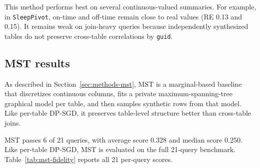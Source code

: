 \documentclass[12pt,letterpaper]{article}
\renewcommand{\_}{\textunderscore\allowbreak}
\begin{document}
This method performs best on several continuous-valued summaries. For example, in \texttt{SleepPivot}, on-time and off-time remain close to real values (RE 0.13 and 0.15). It remains weak on join-heavy queries because independently synthesized tables do not preserve cross-table correlations by \texttt{guid}.

\subsection{MST results}

As described in Section~\ref{sec:methods-mst}, MST is a marginal-based baseline that discretizes continuous columns, fits a private maximum-spanning-tree graphical model per table, and then samples synthetic rows from that model. Like per-table DP-SGD, it preserves table-level structure better than cross-table joins.

MST passes 6 of 21 queries, with average score 0.328 and median score 0.250. Like per-table DP-SGD, MST is evaluated on the full 21-query benchmark. Table~\ref{tab:mst-fidelity} reports all 21 per-query scores.
\end{document}
